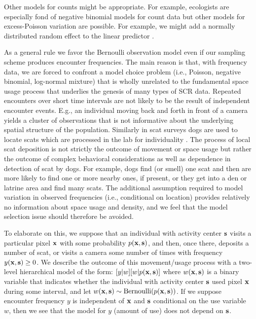 Other models for counts might be appropriate. For example, ecologists
are especially fond of negative binomial models for count data
\citep{verhoef_boveng:2007,white_bennetts:1996,kery_etal:2005}
but other models for excess-Poisson variation are possible. For
example, we might add a normally distributed random effect to
the linear predictor \citep{coull_agresti:1999}.

As a general rule we favor the Bernoulli observation model even if our
sampling scheme produces encounter frequencies. The main reason is
that, with frequency data, we are forced to confront a model choice
problem (i.e., Poisson, negative binomial, log-normal mixture) that is
wholly unrelated to the fundamental space usage process that underlies
the genesis of many types of SCR data.  Repeated encounters over short
time intervals are not likely to be the result of independent
encounter events. E.g., an individual moving back and forth in front
of a camera yields a cluster of observations that is not informative
about the underlying spatial structure of the population. Similarly in
scat surveys dogs are used to locate scats which are processed in the
lab for individuality \citep{kohn_etal:1999, mackay_etal:2008,
  thompson_etal:2012}.  The process of local scat deposition is not
strictly the outcome of movement or space usage but rather the outcome
of complex behavioral considerations as well as dependence in
detection of scat by dogs.  For example, dogs find (or smell) one scat
and then are more likely to find one or more nearby ones, if present,
or they get into a den or latrine area and find many scats.  The
additional assumption required to model variation in observed
frequencies (i.e., conditional on location) provides relatively no
information about space usage and density, and we feel that the model
selection issue should therefore be avoided.

To elaborate on this, we suppose that an individual with activity
center ${\bf s}$ visits a particular pixel ${\bf x}$ with some
probability $p({\bf x}, {\bf s})$, and then, once there, deposits a
number of scat, or visits a camera some number of times with frequency
$y({\bf x},{\bf s}) \ge 0$.  We describe the outcome of this
movement/usage process with a two-level hierarchical model of the
form: $[y|w][w|p({\bf x},{\bf s})]$ where $w({\bf x},{\bf s})$ is a
binary variable that indicates whether the individual with activity
center ${\bf s}$ used pixel ${\bf x}$ during some interval, and let
$w({\bf x},{\bf s}) \sim \mbox{Bernoulli}(p({\bf x},{\bf s}))$. If we
suppose encounter frequency $y$ is independent of ${\bf x}$ and ${\bf
  s}$ conditional on the use variable $w$, then we see that the model
for $y$ (amount of use) does not depend on ${\bf s}$.


